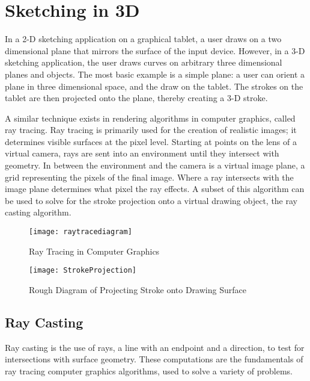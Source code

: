 \chapter{Sketching in 3D}

In a 2-D sketching application on a graphical tablet, a user draws on a two dimensional plane that mirrors the surface of the input device.
However, in a 3-D sketching application, the user draws curves on arbitrary three dimensional planes and objects.
The most basic example is a simple plane: a user can orient a plane in three dimensional space, and the draw on the tablet.
The strokes on the tablet are then projected onto the plane, thereby creating a 3-D stroke.

A similar technique exists in rendering algorithms in computer graphics, called ray tracing.
Ray tracing is primarily used for the creation of realistic images; it determines visible surfaces at the pixel level. 
Starting at points on the lens of a virtual camera, rays are sent into an environment until they intersect with geometry.
In between the environment and the camera is a virtual image plane, a grid representing the pixels of the final image.
Where a ray intersects with the image plane determines what pixel the ray effects.
A subset of this algorithm can be used to solve for the stroke projection onto a virtual drawing object, the ray casting algorithm.


\begin{figure}
\texttt{[image: raytracediagram]}
\caption{Ray Tracing in Computer Graphics}
\end{figure} 
\begin{figure}
\texttt{[image: StrokeProjection]}
\caption{Rough Diagram of Projecting Stroke onto Drawing Surface}
\end{figure} 

\section{Ray Casting}

Ray casting is the use of rays, a line with an endpoint and a direction, to test for intersections with surface geometry.
These computations are the fundamentals of ray tracing computer graphics algorithms, used to solve a variety of problems.

